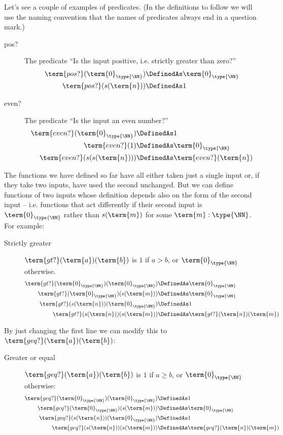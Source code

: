 Let's see a couple of examples of predicates.  (In the definitions to follow we will use the naming convention that the names of predicates always end in a question mark.)
%
\begin{description}
\item[pos?]  The predicate ``Is the input positive, i.e. strictly greater than zero?''
 \begin{align*}
\term{pos?}(\term{0}_{\type{\NN}}) &\DefinedAs 
\term{0}_{\type{\NN}}
\\
\term{pos?}(s(\term{n})) &\DefinedAs
1
\end{align*}
%
\item[even?]  The predicate ``Is the input an even number?''
\begin{align*}
\term{even?}(\term{0}_{\type{\NN}}) &\DefinedAs 
1
\\
\term{even?}(1) &\DefinedAs 
\term{0}_{\type{\NN}}
\\
\term{even?}(s(s(\term{n}))) &\DefinedAs
\term{even?}(\term{n})
\end{align*}

\end{description}
%
%
The functions we have defined so far have all either taken just a single input or, if they take two inputs, have used the second unchanged.  But we can define functions of two inputs whose definition depends also on the form of the second input -- i.e. functions that act differently if their second input is $\term{0}_{\type{\NN}}$ rather than $s(\term{m})$ for some $\term{m}:\type{\NN}$.  For example:
\begin{description}
\item[Strictly greater]  $\term{gt?}(\term{a})(\term{b})$ is $1$ if $a>b$, or $\term{0}_{\type{\NN}}$ otherwise.
 \begin{align*}
\term{gt?}
(\term{0}_{\type{\NN}})
(\term{0}_{\type{\NN}})
&\DefinedAs 
\term{0}_{\type{\NN}}
\\
\term{gt?}(\term{0}_{\type{\NN}})(s(\term{m})) 
&\DefinedAs 
\term{0}_{\type{\NN}}
\\
\term{gt?}(s(\term{n}))(\term{0}_{\type{\NN}}) &\DefinedAs
1
\\
\term{gt?}(s(\term{n}))(s(\term{m})) &\DefinedAs
\term{gt?}(\term{n})(\term{m})
\end{align*}
\end{description}
%
By just changing the first line we can modify this to $\term{geq?}(\term{a})(\term{b})$:
\begin{description}
\item[Greater or equal]  $\term{geq?}(\term{a})(\term{b})$ is $1$ if $a \geq b$, or $\term{0}_{\type{\NN}}$ otherwise:
 \begin{align*}
\term{geq?}
(\term{0}_{\type{\NN}})
(\term{0}_{\type{\NN}})
&\DefinedAs 
1
\\
\term{geq?}(\term{0}_{\type{\NN}})(s(\term{m})) 
&\DefinedAs 
\term{0}_{\type{\NN}}
\\
\term{geq?}(s(\term{n}))(\term{0}_{\type{\NN}}) &\DefinedAs
1
\\
\term{geq?}(s(\term{n}))(s(\term{m})) &\DefinedAs
\term{geq?}(\term{n})(\term{m})
\end{align*}
\end{description}
